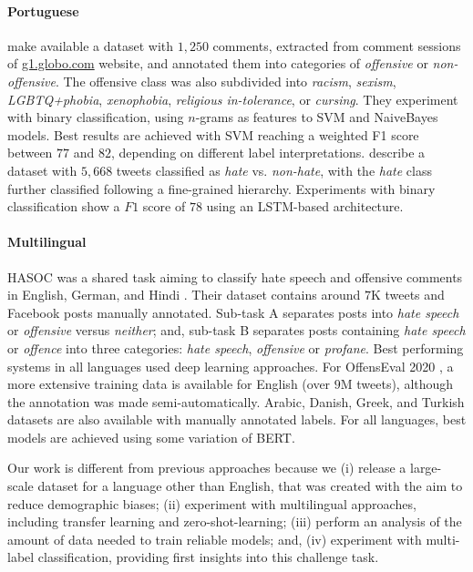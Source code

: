 \documentclass[11pt,a4paper]{article}
\begin{document}
\paragraph{Portuguese}  make available a dataset with $1,250$ comments, extracted from comment sessions of \url{g1.globo.com} website, and annotated them into categories of \textit{offensive} or \textit{non-offensive}. The offensive class was also subdivided into \textit{racism}, \textit{sexism}, \textit{LGBTQ+phobia}, \textit{xenophobia}, \textit{religious in-tolerance}, or \textit{cursing}. They experiment with binary classification, using $n$-grams as features to SVM and NaiveBayes models. Best results are achieved with SVM reaching a weighted F1 score between $77$ and $82$, depending on different label interpretations.  describe a dataset with $5,668$ tweets classified as \textit{hate} vs. \textit{non-hate}, with the \textit{hate} class further classified following a fine-grained hierarchy. Experiments with binary classification show a $F1$ score of $78$ using an LSTM-based architecture.

\paragraph{Multilingual} HASOC was a shared task aiming to classify hate speech and offensive comments in English, German, and Hindi \cite{mandl-etal-2019}. Their dataset contains around $7$K tweets and Facebook posts manually annotated. Sub-task A separates posts into \textit{hate speech} or \textit{offensive} versus \textit{neither}; and, sub-task B separates posts containing \textit{hate speech} or \textit{offence} into three categories: \textit{hate speech}, \textit{offensive} or \textit{profane}. Best performing systems in all languages used deep learning approaches.
For OffensEval 2020 \cite{zampieri-etal-2020-semeval}, a more extensive training data is available for English (over $9$M tweets), although the annotation was made semi-automatically. Arabic, Danish, Greek, and Turkish datasets are also available with manually annotated labels. For all languages, best models are achieved using some variation of BERT.    

Our work is different from previous approaches because we (i) release a large-scale dataset for a language other than English, that was created with the aim to reduce demographic biases; (ii) experiment with multilingual approaches, including transfer learning and zero-shot-learning; (iii) perform an analysis of the amount of data needed to train reliable models; and, (iv) experiment with multi-label classification, providing first insights into this challenge task.
\end{document}
